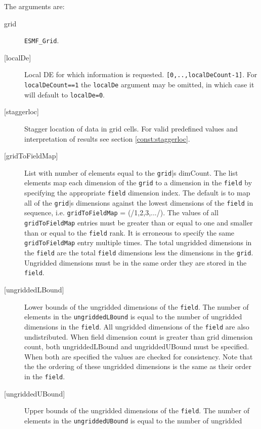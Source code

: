    The arguments are:
   \begin{description}
   \item [grid]
         {\tt ESMF\_Grid}.
   \item [{[localDe]}]
         Local DE for which information is requested. {\tt [0,..,localDeCount-1]}.
         For {\tt localDeCount==1} the {\tt localDe} argument may be omitted,
         in which case it will default to {\tt localDe=0}.
   \item [{[staggerloc]}]
         Stagger location of data in grid cells.  For valid
         predefined values and interpretation of results see
         section \ref{const:staggerloc}.
   \item [{[gridToFieldMap]}]
         List with number of elements equal to the
         {\tt grid}|s dimCount.  The list elements map each dimension
         of the {\tt grid} to a dimension in the {\tt field} by
         specifying the appropriate {\tt field} dimension index. The default is to
         map all of the {\tt grid}|s dimensions against the lowest dimensions of
         the {\tt field} in sequence, i.e. {\tt gridToFieldMap} = (/1,2,3,.../).
         The values of all {\tt gridToFieldMap} entries must be greater than or equal
         to one and smaller than or equal to the {\tt field} rank.
         It is erroneous to specify the same {\tt gridToFieldMap} entry
         multiple times. The total ungridded dimensions in the {\tt field}
         are the total {\tt field} dimensions less
         the dimensions in
         the {\tt grid}.  Ungridded dimensions must be in the same order they are
         stored in the {\tt field}.  
   \item [{[ungriddedLBound]}]
         Lower bounds of the ungridded dimensions of the {\tt field}.
         The number of elements in the {\tt ungriddedLBound} is equal to the number of ungridded
         dimensions in the {\tt field}.  All ungridded dimensions of the
         {\tt field} are also undistributed. When field dimension count is
         greater than grid dimension count, both ungriddedLBound and ungriddedUBound
         must be specified. When both are specified the values are checked
         for consistency.  Note that the the ordering of
         these ungridded dimensions is the same as their order in the {\tt field}.
   \item [{[ungriddedUBound]}]
         Upper bounds of the ungridded dimensions of the {\tt field}.
         The number of elements in the {\tt ungriddedUBound} is equal to the number of ungridded

\end{description}

